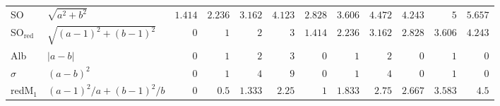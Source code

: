 \begin{table}[h]
{\begin{tabular}{llrrrrrrrrrr}
SO & $\sqrt{a^2+b^2}$ & $1.414$ & $2.236$ & $3.162$ & $4.123$ & $2.828$ & $3.606$ & $4.472$ & $4.243$ & $5$ & $5.657$\\
SO$_{\mathrm{red}}$ & $\sqrt{(a-1)^2+(b-1)^2}$ & $0$ & $1$ & $2$ & $3$ & $1.414$ & $2.236$ & $3.162$ & $2.828$ & $3.606$ & $4.243$\\
Alb & $|a-b|$ & $0$ & $1$ & $2$ & $3$ & $0$ & $1$ & $2$ & $0$ & $1$ & $0$\\
$\sigma$ & $(a-b)^2$ & $0$ & $1$ & $4$ & $9$ & $0$ & $1$ & $4$ & $0$ & $1$ & $0$\\
redM$_1$ & $(a-1)^2/a+(b-1)^2/b$ & $0$ & $0.5$ & $1.333$ & $2.25$ & $1$ & $1.833$ & $2.75$ & $2.667$ & $3.583$ & $4.5$\\
\bottomrule
\end{tabular}}
\end{table}

